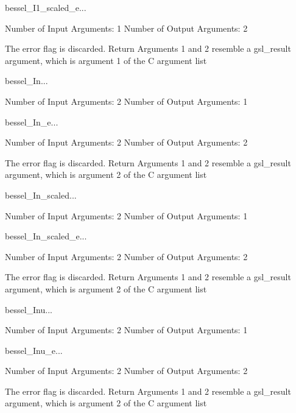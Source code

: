 \begin{funcdesc}{bessel_I1_scaled_e}{...}

    Number of Input  Arguments:  1
    Number of Output Arguments:  2

The error flag is discarded.
Return Arguments 1 and 2 resemble a gsl_result argument,
	which is  argument 1 of the C argument list

\end{funcdesc}

\begin{funcdesc}{bessel_In}{...}

    Number of Input  Arguments:  2
    Number of Output Arguments:  1
\end{funcdesc}

\begin{funcdesc}{bessel_In_e}{...}

    Number of Input  Arguments:  2
    Number of Output Arguments:  2

The error flag is discarded.
Return Arguments 1 and 2 resemble a gsl_result argument,
	which is  argument 2 of the C argument list

\end{funcdesc}

\begin{funcdesc}{bessel_In_scaled}{...}

    Number of Input  Arguments:  2
    Number of Output Arguments:  1
\end{funcdesc}

\begin{funcdesc}{bessel_In_scaled_e}{...}

    Number of Input  Arguments:  2
    Number of Output Arguments:  2

The error flag is discarded.
Return Arguments 1 and 2 resemble a gsl_result argument,
	which is  argument 2 of the C argument list

\end{funcdesc}

\begin{funcdesc}{bessel_Inu}{...}

    Number of Input  Arguments:  2
    Number of Output Arguments:  1
\end{funcdesc}

\begin{funcdesc}{bessel_Inu_e}{...}

    Number of Input  Arguments:  2
    Number of Output Arguments:  2

The error flag is discarded.
Return Arguments 1 and 2 resemble a gsl_result argument,
	which is  argument 2 of the C argument list

\end{funcdesc}

